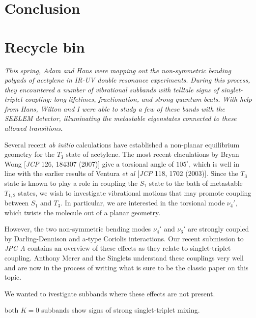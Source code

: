 \documentclass[12pt]{mitthesis}
\begin{document}

\section{Conclusion}

\section{Recycle bin}

\emph{This spring, Adam and Hans were mapping out the non-symmetric
  bending polyads of acetylene in IR-UV double resonance experiments.
  During this process, they encountered a number of vibrational
  subbands with telltale signs of singlet-triplet coupling: long
  lifetimes, fractionation, and strong quantum beats.  With help from
  Hans, Wilton and I were able to study a few of these bands with the
  SEELEM detector, illuminating the metastable eigenstates connected
  to these allowed transitions.}


Several recent \emph{ab initio} calculations have established a
non-planar equilibrium geometry for the $T_3$ state of acetylene.  The
most recent claculations by Bryan Wong [\emph{JCP} 126, 184307 (2007)]
give a torsional angle of $105^\circ$, which is well in line with the
earlier results of Ventura \emph{et al} [\emph{JCP} 118, 1702 (2003)].
Since the $T_3$ state is known to play a role in coupling the $S_1$
state to the bath of metastable $T_{1,2}$ states, we wish to
investigate vibrational motions that may promote coupling between
$S_1$ and $T_3$.  In particular, we are interested in the torsional
mode $\nu_4'$, which twists the molecule out of a planar geometry.

However, the two non-symmetric bending modes $\nu_4'$ and $\nu_6'$ are
strongly coupled by Darling-Dennison and a-type Coriolis interactions.
Our recent submission to \emph{JPC A} contains an overview of these
effects as they relate to singlet-triplet coupling.  Anthony Merer and
the Singlets understand these couplings very well and are now in the
process of writing what is sure to be the classic paper on this topic.

We wanted to ivestigate subbands where these effects are not present.

both $K=0$ subbands show signs of strong singlet-triplet mixing.
\end{document}
